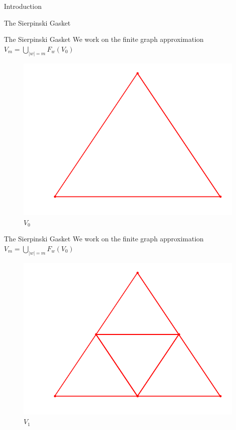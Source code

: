 \documentclass[xcolor = dvipsnames]{beamer}
\begin{document}
\begin{section}{Introduction}
\begin{frame}{The Sierpinski Gasket}
\end{frame}
\begin{frame}{The Sierpinski Gasket}
    We work on the finite graph approximation $V_m = \bigcup_{|w|=m}F_{w}(V_0)$
    \begin{figure}
        \centering
        \includegraphics[width=0.7\linewidth]{images/V0.png}
        \caption{$V_0$}
    \end{figure}
\end{frame}
\begin{frame}{The Sierpinski Gasket}
    We work on the finite graph approximation $V_m = \bigcup_{|w|=m}F_{w}(V_0)$
    \begin{figure}
        \centering
        \includegraphics[width=0.7\linewidth]{images/V1.png}
        \caption{$V_1$}
    \end{figure}
\end{frame}


\end{section}
\end{document}
